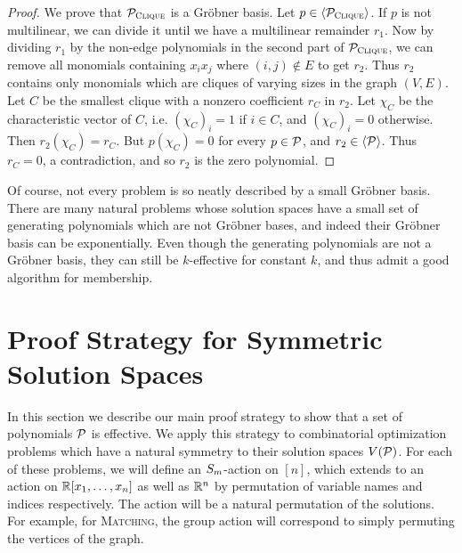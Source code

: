 \begin{proof}
We prove that $\mathcal P_{\textsc{Clique}}$ is a Gr\"obner basis. Let $p \in \langle \mathcal P_{\textsc{Clique}} \rangle$. If $p$ is not multilinear, we can divide it until we have a multilinear
remainder $r_1$. Now by dividing $r_1$ by the non-edge polynomials in the second part of $\mathcal P_{\textsc{Clique}}$, we can remove all monomials containing $x_ix_j$ where $(i,j) \notin E$
to get $r_2$. Thus $r_2$ contains only monomials which are cliques of varying sizes in the graph $(V,E)$. Let $C$ be the smallest clique with a
nonzero coefficient $r_C$ in $r_2$. Let $\chi_C$ be the characteristic vector of $C$, i.e. $(\chi_C)_i = 1$ if $i \in C$, and $(\chi_C)_i = 0$ otherwise.
Then $r_2(\chi_C) = r_C$. But $p(\chi_C) = 0$ for every $p \in \mathcal P$, and $r_2 \in \langle \mathcal P \rangle$. Thus $r_C = 0$, a contradiction, and so $r_2$ is the 
zero polynomial.
\end{proof}

Of course, not every problem is so neatly described by a small Gr\"obner basis. There are many natural problems whose solution spaces have a small set of generating
polynomials which are not Gr\"obner bases, and indeed their Gr\"obner basis can be exponentially. 
Even though the generating polynomials are not a Gr\"obner basis, they can still be $k$-effective for constant $k$, and thus admit a good algorithm for membership.

\section{Proof Strategy for Symmetric Solution Spaces}\label{sec:strategy}
In this section we describe our main proof strategy to show that a set of polynomials $\mathcal P$ is effective. 
We apply this strategy to combinatorial optimization problems which have a natural symmetry to their solution spaces $V(\mathcal P)$. 
For each of these problems, we will define an $S_{m}$-action on $[n]$, which extends to an action on $\mathbb R[x_1,\dots,x_n]$ as well as $\mathbb R^n$ by permutation of variable names and indices respectively. 
The action will be a natural permutation of the solutions. For example, for \textsc{Matching}, the group action will correspond to simply permuting the vertices of the graph. 

